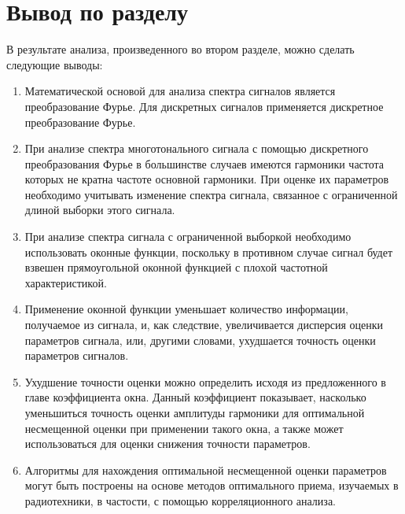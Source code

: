 \section{Вывод по разделу} \label{sec:ch2/sec7}
В результате анализа, произведенного во втором разделе, можно сделать следующие выводы:
\begin{enumerate}
\item  Математической основой для анализа спектра сигналов является преобразование Фурье. Для дискретных сигналов применяется дискретное преобразование Фурье.

\item  При анализе спектра многотонального сигнала с помощью дискретного преобразования Фурье в большинстве случаев имеются гармоники частота которых не кратна частоте основной гармоники. При оценке их параметров необходимо учитывать изменение спектра сигнала, связанное с ограниченной длиной выборки этого сигнала.

\item  При анализе спектра сигнала с ограниченной выборкой необходимо использовать оконные функции, поскольку в противном случае сигнал будет взвешен прямоугольной оконной функцией с плохой частотной характеристикой.

\item  Применение оконной функции уменьшает количество информации, получаемое из сигнала, и, как следствие, увеличивается дисперсия оценки параметров сигнала, или, другими словами, ухудшается точность оценки параметров сигналов.

\item  Ухудшение точности оценки можно определить исходя из предложенного в главе коэффициента окна. Данный коэффициент показывает, насколько уменьшиться точность оценки амплитуды гармоники для оптимальной несмещенной оценки при применении такого окна, а также может использоваться для оценки снижения точности параметров.

\item   Алгоритмы для нахождения оптимальной несмещенной оценки параметров могут быть построены на основе методов оптимального приема, изучаемых в радиотехники, в частости, с помощью корреляционного анализа.
\end{enumerate}





